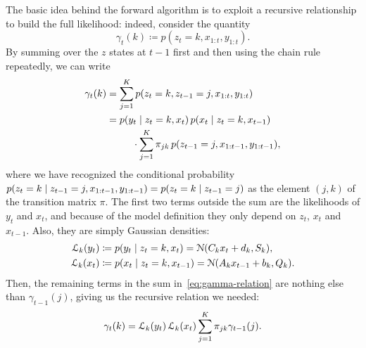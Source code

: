 \documentclass[10pt, twocolumn, headings=small, footlines=1, DIV=calc]{scrartcl}
\begin{document}
The basic idea behind the forward algorithm is to exploit a recursive
relationship to build the full likelihood: indeed, consider the quantity
\begin{equation}
  \gamma_{t}(k) \coloneq p(z_{t} = k, x_{1:t}, y_{1:t}).
\end{equation}
By summing over the $z$ states at $t-1$ first and then using the chain rule
repeatedly, we can write
\begin{equation}
  \begin{split}
    \gamma_{t}(k) &= \sum_{j=1}^{K}
      p(z_{t} = k, z_{t-1} = j, x_{1:t}, y_{1:t}) \\
      &= \!\begin{multlined}[t]
        p(y_{t} \given z_{t} = k, x_{t}) \,
        p(x_{t} \given z_{t} = k, x_{t-1}) \\
        \cdot \sum_{j=1}^{K} \pi_{jk}\,
          p(z_{t-1} = j, x_{1:t-1}, y_{1:t-1}),
      \end{multlined}
  \end{split}
\label{eq:gamma-relation}
\end{equation}
where we have recognized the conditional probability $p(z_{t} = k \;\vert\; z_{t-1}
= j, x_{1:t-1}, y_{1:t-1}) = p(z_{t} = k \;\vert\; z_{t-1} = j)$ as the element
$(j, k)$ of the transition matrix $\pi$. The first two terms outside the sum are
the likelihoods of $y_{t}$ and $x_{t}$, and because of the model definition they
only depend on $z_{t}$, $x_{t}$ and $x_{t-1}$. Also, they are simply Gaussian
densities:
\begin{align}
  \mathcal{L}_{k}(y_{t}) &\coloneq p(y_{t} \;\vert\; z_{t} = k, x_{t})
    = \mathcal{N}(C_{k} x_{t} + d_{k}, S_{k}), \\
  \mathcal{L}_{k}(x_{t}) &\coloneq p(x_{t} \;\vert\; z_{t} = k, x_{t-1})
    = \mathcal{N}(A_{k} x_{t-1} + b_{k}, Q_{k}).
\end{align}
Then, the remaining terms in the sum in~\eqref{eq:gamma-relation} are nothing
else than $\gamma_{t-1}(j)$, giving us the recursive relation we needed:
\begin{equation}
  \gamma_{t}(k) = \mathcal{L}_{k}(y_{t})\, \mathcal{L}_{k}(x_{t})
    \sum_{j=1}^{K} \pi_{jk} \gamma_{t-1}(j).
\end{equation}
\end{document}
